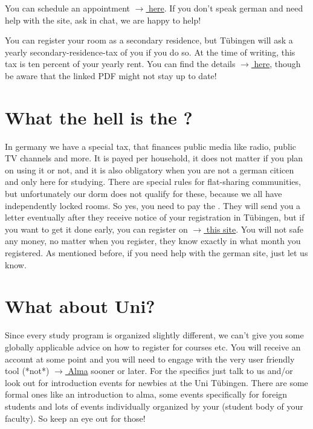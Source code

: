You can schedule an appointment \href{https://www.tuebingen.de/verwaltung/onlinedienste#/anmeldung_wohnsitz}{$\rightarrow{}$ here}. If you don't speak german and need help with the site, ask in chat, we are happy to help!

You can register your room as a secondary residence, but Tübingen will ask a yearly secondary-residence-tax of you if you do so. At the time of writing, this tax is ten percent of your yearly rent. You can find the details \href{https://www.tuebingen.de/verwaltung/uploads/zweitwohnungsteuersatzung.pdf}{$\rightarrow{}$ here}, though be aware that the linked PDF might not stay up to date!

\section{What the hell is the ?}

In germany we have a special tax, that finances public media like radio, public TV channels and more. It is payed per household, it does not matter if you plan on using it or not, and it is also obligatory when you are not a german citicen and only here for studying. There are special rules for flat-sharing communities, but unfortunately our dorm does not qualify for these, because we all have independently locked rooms. So yes, you need to pay the . They will send you a letter eventually after they receive notice of your registration in Tübingen, but if you want to get it done early, you can register on \href{https://www.rundfunkbeitrag.de/buergerinnen_und_buerger/formulare/anmelden/index_ger.html}{$\rightarrow{}$ this site}. You will not safe any money, no matter when you register, they know exactly in what month you registered. As mentioned before, if you need help with the german site, just let us know.

\section{What about Uni?}

Since every study program is organized slightly different, we can't give you some globally applicable advice on how to register for courses etc. You will receive an account at some point and you will need to engage with the very user friendly tool (*not*) \href{https://alma.uni-tuebingen.de}{$\rightarrow{}$ Alma} sooner or later. For the specifics just talk to us and/or look out for introduction events for newbies at the Uni Tübingen. There are some formal ones like an introduction to alma, some events specifically for foreign students and lots of events individually organized by your  (student body of your faculty). So keep an eye out for those!

